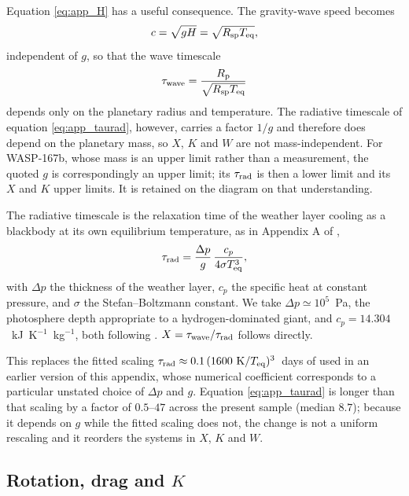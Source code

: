 \documentclass[trackchanges,twocolumn]{aastex7}
\begin{document}
Equation \eqref{eq:app_H} has a useful consequence. The gravity-wave speed becomes
\begin{equation}
    c = \sqrt{gH} = \sqrt{R_{\rm sp} T_{\rm eq}},
\end{equation}
independent of $g$, so that the wave timescale
\begin{equation}
    \tau_{\rm wave} = \frac{R_{\rm p}}{\sqrt{R_{\rm sp} T_{\rm eq}}}
    \label{eq:app_tauwave}
\end{equation}
depends only on the planetary radius and temperature. The radiative timescale of equation \eqref{eq:app_taurad}, however, carries a factor $1/g$ and therefore does depend on the planetary mass, so $X$, $K$ and $W$ are not mass-independent. For WASP-167b, whose mass is an upper limit rather than a measurement, the quoted $g$ is correspondingly an upper limit; its $\tau_{\rm rad}$ is then a lower limit and its $X$ and $K$ upper limits. It is retained on the diagram on that understanding.

The radiative timescale is the relaxation time of the weather layer cooling as a blackbody at its own equilibrium temperature, as in Appendix A of \cite{Banik2025},
\begin{equation}
    \tau_{\rm rad} = \frac{\Delta p}{g}\,\frac{c_{p}}{4\sigma T_{\rm eq}^{3}},
    \label{eq:app_taurad}
\end{equation}
with $\Delta p$ the thickness of the weather layer, $c_{p}$ the specific heat at constant pressure, and $\sigma$ the Stefan--Boltzmann constant. We take $\Delta p \simeq 10^{5}$~Pa, the photosphere depth appropriate to a hydrogen-dominated giant, and $c_{p} = 14.304$~kJ~K$^{-1}$~kg$^{-1}$, both following \cite{Banik2025}. $X = \tau_{\rm wave}/\tau_{\rm rad}$ follows directly.

This replaces the fitted scaling $\tau_{\rm rad}\approx 0.1\,(1600~\mathrm{K}/T_{\rm eq})^{3}$~days of \cite{perez2013atmospheric} used in an earlier version of this appendix, whose numerical coefficient corresponds to a particular unstated choice of $\Delta p$ and $g$. Equation \eqref{eq:app_taurad} is longer than that scaling by a factor of $0.5$--$47$ across the present sample (median $8.7$); because it depends on $g$ while the fitted scaling does not, the change is not a uniform rescaling and it reorders the systems in $X$, $K$ and $W$.

\subsection{Rotation, drag and $K$}
\end{document}
